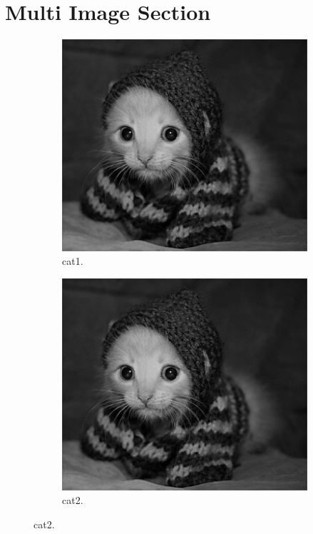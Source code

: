 \documentclass{article}
\begin{document}
\section{Multi Image Section}
\begin{figure}[h!]
\centering
\begin{subfigure}[b]{0.4\linewidth}
\includegraphics[width=\linewidth]{profile2.jpg}
\caption{cat1.}
\end{subfigure}
\begin{subfigure}[b]{0.4\linewidth}
\includegraphics[width=\linewidth]{profile2.jpg}
\caption{cat2.}
\end{subfigure}

\end{figure}

\newpage

\begin{appendix}
  \listoffigures
  \listoftables
\end{appendix}
\end{document}
